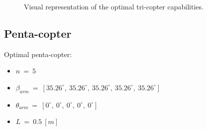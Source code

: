 \begin{figure}[!h]
{  }
  \hspace*{\fill} %
  \caption{Visual representation of the optimal tri-copter capabilities.}
  \label{fig:Tricopter_result}
\end{figure}

\subsection{Penta-copter}
\label{sec:penta_copter}
Optimal penta-copter:
\begin{itemize}
  \item $n\ =\ 5$
  \item $\beta_{arm}\ =\ [35.26^{\circ},\  35.26^{\circ},\  35.26^{\circ},\  35.26^{\circ},\   35.26^{\circ}]$
  \item $\theta_{arm}\ =\ [0^{\circ},\  0^{\circ},\  0^{\circ},\  0^{\circ},\  0^{\circ}]$
  \item $L\ =\ 0.5\ [m]$
\end{itemize}

